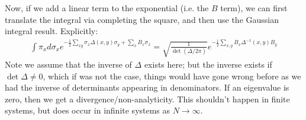 Now, if we add a linear term to the exponential (i.e. the $B$ term), we can first translate the integral via completing the square, and then use the Gaussian integral result. Explicitly:
\begin{equation}
    \begin{split}
        \int \pi_x d\sigma_x e^{-\frac{1}{2}\sum_{xy}\sigma_x \Delta(x, y)\sigma_y + \sum_x B_x \sigma_x} = \sqrt{\frac{1}{\det(\Delta/2\pi)}}e^{-\frac{1}{2}\sum_{x, y}B_x\Delta^{-1}(x, y)B_y}
    \end{split}
\end{equation}
Note we assume that the inverse of $\Delta$ exists here; but the inverse exists if $\det \Delta \neq 0$, which if was not the case, things would have gone wrong before as we had the inverse of determinants appearing in denominators. If an eigenvalue is zero, then we get a divergence/non-analyticity. This shouldn't happen in finite systems, but does occur in infinite systems as $N \to \infty$.

